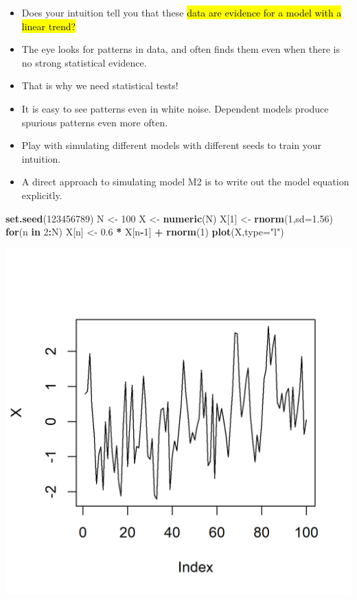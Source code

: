 \documentclass[]{article}
\newenvironment{Shaded}{\begin{snugshade}}{\end{snugshade}}
\newcommand{\KeywordTok}[1]{\textcolor[rgb]{0.13,0.29,0.53}{\textbf{#1}}}
\newcommand{\DataTypeTok}[1]{\textcolor[rgb]{0.13,0.29,0.53}{#1}}
\newcommand{\DecValTok}[1]{\textcolor[rgb]{0.00,0.00,0.81}{#1}}
\newcommand{\FloatTok}[1]{\textcolor[rgb]{0.00,0.00,0.81}{#1}}
\newcommand{\StringTok}[1]{\textcolor[rgb]{0.31,0.60,0.02}{#1}}
\newcommand{\ControlFlowTok}[1]{\textcolor[rgb]{0.13,0.29,0.53}{\textbf{#1}}}
\newcommand{\OperatorTok}[1]{\textcolor[rgb]{0.81,0.36,0.00}{\textbf{#1}}}
\newcommand{\NormalTok}[1]{#1}
\begin{document}
\begin{itemize}
\item
  Does your intuition tell you that these \hl{data are evidence for a model
  with a linear trend?}
\item
  The eye looks for patterns in data, and often finds them even when
  there is no strong statistical evidence.
\item
  That is why we need statistical tests!
\item
  It is easy to see patterns even in white noise. Dependent models
  produce spurious patterns even more often.
\item
  Play with simulating different models with different seeds to train
  your intuition.
\item
  A direct approach to simulating model M2 is to write out the model
  equation explicitly.
\end{itemize}

\begin{Shaded}
\begin{Highlighting}[]
\KeywordTok{set.seed}\NormalTok{(}\DecValTok{123456789}\NormalTok{)}
\NormalTok{N <-}\StringTok{ }\DecValTok{100}
\NormalTok{X <-}\StringTok{ }\KeywordTok{numeric}\NormalTok{(N)}
\NormalTok{X[}\DecValTok{1}\NormalTok{] <-}\StringTok{ }\KeywordTok{rnorm}\NormalTok{(}\DecValTok{1}\NormalTok{,}\DataTypeTok{sd=}\FloatTok{1.56}\NormalTok{)}
\ControlFlowTok{for}\NormalTok{(n }\ControlFlowTok{in} \DecValTok{2}\OperatorTok{:}\NormalTok{N) X[n] <-}\StringTok{ }\FloatTok{0.6} \OperatorTok{*}\StringTok{ }\NormalTok{X[n}\OperatorTok{-}\DecValTok{1}\NormalTok{] }\OperatorTok{+}\StringTok{ }\KeywordTok{rnorm}\NormalTok{(}\DecValTok{1}\NormalTok{)}
\KeywordTok{plot}\NormalTok{(X,}\DataTypeTok{type=}\StringTok{"l"}\NormalTok{)}
\end{Highlighting}
\end{Shaded}

\includegraphics{figure/intro-ar_sim-1.png}
\end{document}
